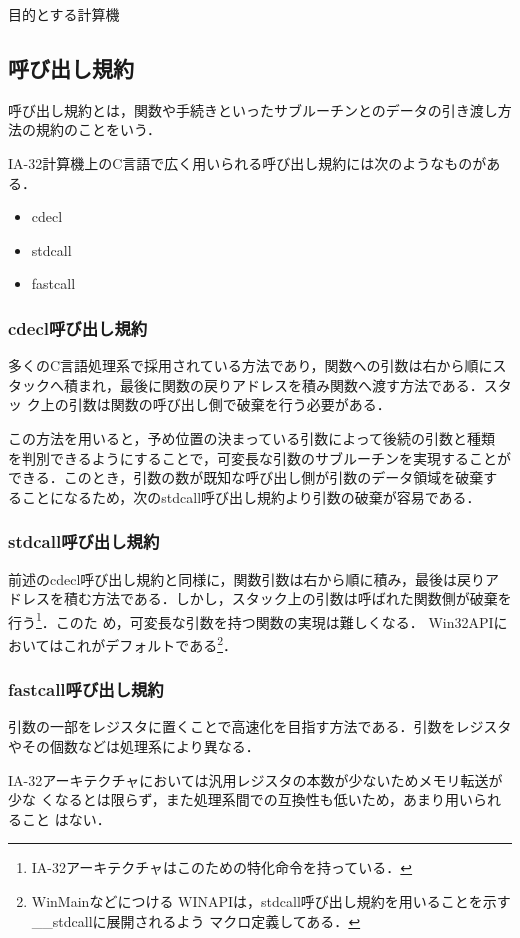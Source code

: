 \documentclass[a4paper,titlepage,report,disablejfam]{jsbook}
\begin{document}
\begin{resbonsiblesection}{目的とする計算機}{\kobori}
\subsection{呼び出し規約}\label{ssc:calling-convention}
呼び出し規約とは，関数や手続きといったサブルーチンとのデータの引き渡し方
法の規約のことをいう．

IA-32計算機上のC言語で広く用いられる呼び出し規約には次のようなものがある．
\begin{itemize}
 \item cdecl
 \item stdcall
 \item fastcall
\end{itemize}

\subsubsection{cdecl呼び出し規約}
多くのC言語処理系で採用されている方法であり，関数への引数は右から順にス
タックへ積まれ，最後に関数の戻りアドレスを積み関数へ渡す方法である．スタッ
ク上の引数は関数の呼び出し側で破棄を行う必要がある．

この方法を用いると，予め位置の決まっている引数によって後続の引数と種類
を判別できるようにすることで，可変長な引数のサブルーチンを実現することが
できる．このとき，引数の数が既知な呼び出し側が引数のデータ領域を破棄す
ることになるため，次のstdcall呼び出し規約より引数の破棄が容易である．

\subsubsection{stdcall呼び出し規約}
前述のcdecl呼び出し規約と同様に，関数引数は右から順に積み，最後は戻りア
ドレスを積む方法である．しかし，スタック上の引数は呼ばれた関数側が破棄を
行う\footnote{IA-32アーキテクチャはこのための特化命令を持っている．}．このた
め，可変長な引数を持つ関数の実現は難しくなる．
Win32APIにおいてはこれがデフォルトである\footnote{WinMainなどにつける
WINAPIは，stdcall呼び出し規約を用いることを示す\_\_stdcallに展開されるよう
マクロ定義してある．}．

\subsubsection{fastcall呼び出し規約}
引数の一部をレジスタに置くことで高速化を目指す方法である．引数をレジスタ
やその個数などは処理系により異なる．

IA-32アーキテクチャにおいては汎用レジスタの本数が少ないためメモリ転送が少な
くなるとは限らず，また処理系間での互換性も低いため，あまり用いられること
はない．


\end{resbonsiblesection}
\end{document}
